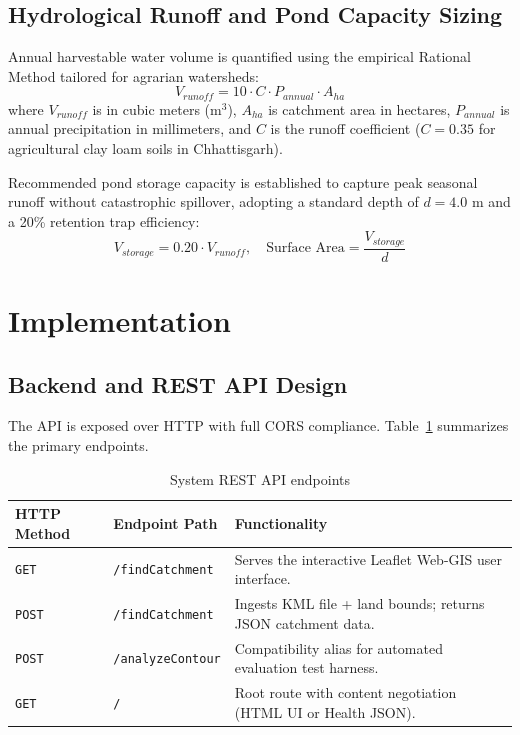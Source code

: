 \documentclass[manuscript,screen]{acmart}
\begin{document}
\subsection{Hydrological Runoff and Pond Capacity Sizing}
Annual harvestable water volume is quantified using the empirical Rational Method tailored for agrarian watersheds:
\begin{equation}
    V_{runoff} = 10 \cdot C \cdot P_{annual} \cdot A_{ha}
\end{equation}
where $V_{runoff}$ is in cubic meters ($\text{m}^3$), $A_{ha}$ is catchment area in hectares, $P_{annual}$ is annual precipitation in millimeters, and $C$ is the runoff coefficient ($C = 0.35$ for agricultural clay loam soils in Chhattisgarh). 

Recommended pond storage capacity is established to capture peak seasonal runoff without catastrophic spillover, adopting a standard depth of $d = 4.0\text{ m}$ and a 20\% retention trap efficiency:
\begin{equation}
    V_{storage} = 0.20 \cdot V_{runoff}, \quad \text{Surface Area} = \frac{V_{storage}}{d}
\end{equation}

\section{Implementation}
\label{sec:implementation}

\subsection{Backend and REST API Design}
The API is exposed over HTTP with full CORS compliance. Table~\ref{tab:api} summarizes the primary endpoints.

\begin{table}[h]
  \caption{System REST API endpoints}
  \label{tab:api}
  \begin{tabular}{lll}
    \toprule
    HTTP Method & Endpoint Path & Functionality \\
    \midrule
    \texttt{GET} & \texttt{/findCatchment} & Serves the interactive Leaflet Web-GIS user interface. \\
    \texttt{POST} & \texttt{/findCatchment} & Ingests KML file + land bounds; returns JSON catchment data. \\
    \texttt{POST} & \texttt{/analyzeContour} & Compatibility alias for automated evaluation test harness. \\
    \texttt{GET} & \texttt{/} & Root route with content negotiation (HTML UI or Health JSON). \\
    \bottomrule
  \end{tabular}
\end{table}
\end{document}
